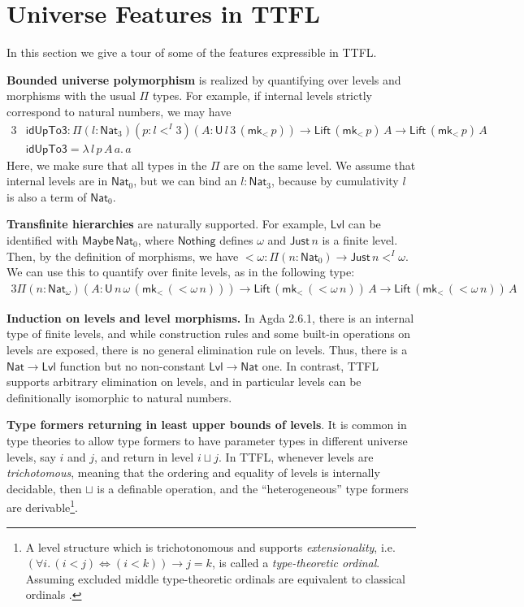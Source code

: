\documentclass[a4paper,UKenglish,cleveref, autoref, thm-restate]{lipics-v2021}
\theoremstyle{remark}
\theoremstyle{definition}
\newcommand{\U}{\mathsf{U}}
\newcommand{\Nat}{\mathsf{Nat}}
\newcommand{\Lift}{\mathsf{Lift}}
\newcommand{\Lvl}{\mathsf{Lvl}}
\renewcommand{\U}{\mathsf{U}}
\newcommand{\msf}[1]{\mathsf{#1}}
\newcommand{\mkMor}{\msf{mk}\!_<}
\begin{document}
\section{Universe Features in TTFL}

In this section we give a tour of some of the features expressible in TTFL.

\textbf{Bounded universe polymorphism} is realized by quantifying
over levels and morphisms with the usual $\Pi$ types. For example, if internal
levels strictly correspond to natural numbers, we may have
\begin{alignat*}{3}
  &\msf{idUpTo3} : \Pi(l : \Nat_3)(p : l <^I 3)(A : \U\,l\,3\,(\mkMor\,p)) \to \Lift\,(\mkMor\,p)\,A \to \Lift\,(\mkMor\,p)\,A\\
  &\msf{idUpTo3} = \lambda\,l\,p\,A\,a.\,a
\end{alignat*}
Here, we make sure that all types in the $\Pi$ are on the same level. We assume
that internal levels are in $\Nat_0$, but we can bind an $l : \Nat_3$, because
by cumulativity $l$ is also a term of $\Nat_0$.

\textbf{Transfinite hierarchies} are naturally supported. For example, $\Lvl$
can be identified with $\msf{Maybe}\,\Nat_0$, where $\msf{Nothing}$ defines
$\omega$ and $\msf{Just}\,n$ is a finite level. Then, by the definition of
morphisms, we have $<\!\omega : \Pi(n : \Nat_0) \to \msf{Just}\,n <^I \omega$.
We can use this to quantify over finite levels, as in the following type:
\begin{alignat*}{3}
  \Pi(n : \Nat_{\omega})(A : \U\,n\,\omega\,(\mkMor\,(<\!\omega\,n))) \to \Lift\,(\mkMor\,(<\!\omega\,n))\,A \to \Lift\,(\mkMor\,(<\!\omega\,n))\,A
\end{alignat*}

\textbf{Induction on levels and level morphisms.} In Agda 2.6.1, there is an
internal type of finite levels, and while construction rules and some built-in
operations on levels are exposed, there is no general elimination rule on levels.
Thus, there is a $\Nat \to \Lvl$ function but no non-constant $\Lvl \to \Nat$ one.
In contrast, TTFL supports arbitrary elimination on levels, and in particular levels
can be definitionally isomorphic to natural numbers.

\textbf{Type formers returning in least upper bounds of levels}. It is common in
type theories to allow type formers to have parameter types in different
universe levels, say $i$ and $j$, and return in level $i \sqcup j$. In TTFL,
whenever levels are \emph{trichotomous}, meaning that the ordering and equality of
levels is internally decidable, then $\sqcup$ is a definable operation, and the
``heterogeneous'' type formers are derivable\footnote{A level structure which is trichotonomous and supports \emph{extensionality}, i.e.\ $(\forall i.\, (i < j) \iff (i < k)) \to j = k$, is called a \emph{type-theoretic ordinal}. Assuming excluded middle type-theoretic ordinals are equivalent to classical ordinals \cite[Section 10.3]{hottbook}.}.
\end{document}
